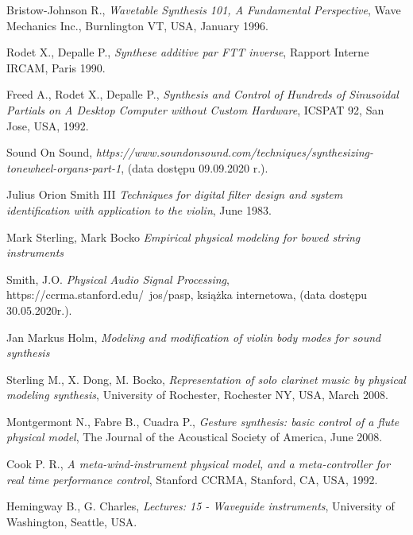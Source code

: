 \documentclass[nostrict]{szablonPG}
\begin{document}
\begin{thebibliography}{20}
		Bristow-Johnson R., \emph{Wavetable Synthesis 101, A Fundamental Perspective}, Wave Mechanics Inc., Burnlington VT, USA, January 1996.
		
		Rodet X., Depalle P., \emph{Synthese additive par FTT inverse}, Rapport Interne IRCAM, Paris 1990.
		
		Freed A., Rodet X., Depalle P., \emph{Synthesis and Control of Hundreds of Sinusoidal Partials on A Desktop Computer without Custom Hardware}, ICSPAT 92, San Jose, USA, 1992.
		
		Sound On Sound, \emph{https://www.soundonsound.com/techniques/synthesizing-tonewheel-organs-part-1}, (data dostępu 09.09.2020 r.).
		
		
		
		Julius Orion Smith III \emph{Techniques for digital filter design and system identification with application to the violin}, June 1983.
		
		Mark Sterling, Mark Bocko \emph{Empirical physical modeling for bowed string instruments}
		
		Smith, J.O. \emph{Physical Audio Signal Processing}, https://ccrma.stanford.edu/~jos/pasp, książka internetowa, (data dostępu 30.05.2020r.).
		
		Jan Markus Holm, \emph{Modeling and modification of violin body modes for sound synthesis}
		
		Sterling M., X. Dong, M. Bocko, \emph{Representation of solo clarinet music by physical modeling synthesis}, University of Rochester, Rochester NY, USA, March 2008.
		
		Montgermont N., Fabre B., Cuadra P., \emph{Gesture synthesis: basic control of a flute physical model}, The Journal of the Acoustical Society of America, June 2008.
		
		Cook P. R., \emph{A meta-wind-instrument physical model, and a meta-controller for real time performance control}, Stanford CCRMA, Stanford, CA, USA, 1992.
		
		Hemingway B., G. Charles, \emph{Lectures: 15 - Waveguide instruments}, University of Washington, Seattle, USA.
	\end{thebibliography}
	
\end{document}
